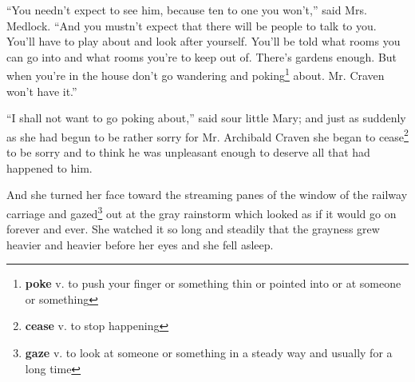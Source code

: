 ``You needn't expect to see him, because ten to one you won't,'' said Mrs. Medlock. ``And you mustn't expect that there will be people to talk to you. You'll have to play about and look after yourself. You'll be told what rooms you can go into and what rooms you're to keep out of. There's gardens enough. But when you're in the house don't go wandering and poking\footnote{\textbf{poke} v. to push your finger or something thin or pointed into or at someone or something} about. Mr. Craven won't have it.''

``I shall not want to go poking about,'' said sour little Mary; and just as suddenly as she had begun to be rather sorry for Mr. Archibald Craven she began to cease\footnote{\textbf{cease} v. to stop happening} to be sorry and to think he was unpleasant enough to deserve all that had happened to him.

And she turned her face toward the streaming panes of the window of the railway carriage and gazed\footnote{\textbf{gaze} v. to look at someone or something in a steady way and usually for a long time} out at the gray rainstorm which looked as if it would go on forever and ever. She watched it so long and steadily that the grayness grew heavier and heavier before her eyes and she fell asleep.
